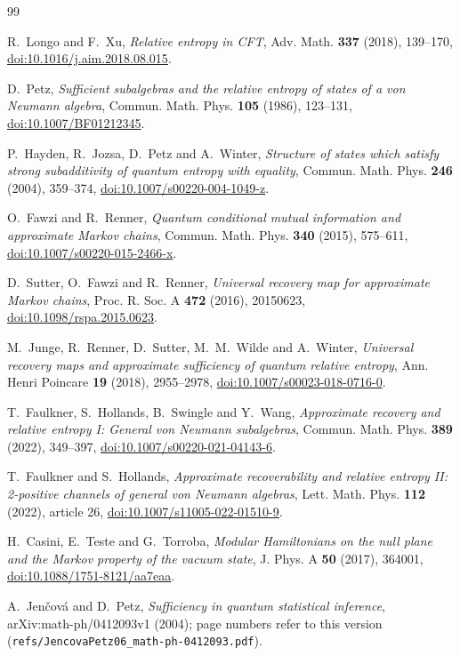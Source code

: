 \documentclass[11pt]{article}
\theoremstyle{accenttheorem}
\theoremstyle{definition}
\newcommand{\1}{\mathbf{1}}
\begin{document}
\begin{thebibliography}{99}

R.~Longo and F.~Xu,
\emph{Relative entropy in CFT},
Adv. Math. \textbf{337} (2018), 139--170,
\href{https://doi.org/10.1016/j.aim.2018.08.015}{doi:10.1016/j.aim.2018.08.015}.

D.~Petz,
\emph{Sufficient subalgebras and the relative entropy of states of a von Neumann algebra},
Commun. Math. Phys. \textbf{105} (1986), 123--131,
\href{https://doi.org/10.1007/BF01212345}{doi:10.1007/BF01212345}.

P.~Hayden, R.~Jozsa, D.~Petz and A.~Winter,
\emph{Structure of states which satisfy strong subadditivity of quantum entropy with equality},
Commun. Math. Phys. \textbf{246} (2004), 359--374,
\href{https://doi.org/10.1007/s00220-004-1049-z}{doi:10.1007/s00220-004-1049-z}.

O.~Fawzi and R.~Renner,
\emph{Quantum conditional mutual information and approximate Markov chains},
Commun. Math. Phys. \textbf{340} (2015), 575--611,
\href{https://doi.org/10.1007/s00220-015-2466-x}{doi:10.1007/s00220-015-2466-x}.

D.~Sutter, O.~Fawzi and R.~Renner,
\emph{Universal recovery map for approximate Markov chains},
Proc. R. Soc. A \textbf{472} (2016), 20150623,
\href{https://doi.org/10.1098/rspa.2015.0623}{doi:10.1098/rspa.2015.0623}.

M.~Junge, R.~Renner, D.~Sutter, M.~M.~Wilde and A.~Winter,
\emph{Universal recovery maps and approximate sufficiency of quantum relative entropy},
Ann. Henri Poincare \textbf{19} (2018), 2955--2978,
\href{https://doi.org/10.1007/s00023-018-0716-0}{doi:10.1007/s00023-018-0716-0}.

T.~Faulkner, S.~Hollands, B.~Swingle and Y.~Wang,
\emph{Approximate recovery and relative entropy I: General von Neumann subalgebras},
Commun. Math. Phys. \textbf{389} (2022), 349--397,
\href{https://doi.org/10.1007/s00220-021-04143-6}{doi:10.1007/s00220-021-04143-6}.

T.~Faulkner and S.~Hollands,
\emph{Approximate recoverability and relative entropy II: 2-positive channels of general von Neumann algebras},
Lett. Math. Phys. \textbf{112} (2022), article 26,
\href{https://doi.org/10.1007/s11005-022-01510-9}{doi:10.1007/s11005-022-01510-9}.

H.~Casini, E.~Teste and G.~Torroba,
\emph{Modular Hamiltonians on the null plane and the Markov property of the vacuum state},
J. Phys. A \textbf{50} (2017), 364001,
\href{https://doi.org/10.1088/1751-8121/aa7eaa}{doi:10.1088/1751-8121/aa7eaa}.

A.~Jen\v{c}ov\'a and D.~Petz,
\emph{Sufficiency in quantum statistical inference},
arXiv:math-ph/0412093v1 (2004); page numbers refer to this version (\texttt{refs/JencovaPetz06\_math-ph-0412093.pdf}).

\end{thebibliography}
\end{document}
